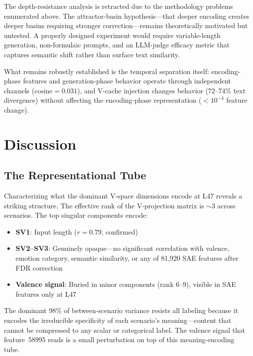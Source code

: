 \documentclass[11pt,a4paper]{article}
\begin{document}
The depth-resistance analysis is retracted due to the methodology problems
enumerated above. The attractor-basin hypothesis---that deeper encoding
creates deeper basins requiring stronger correction---remains theoretically
motivated but untested. A properly designed experiment would require
variable-length generation, non-formulaic prompts, and an LLM-judge
efficacy metric that captures semantic shift rather than surface text
similarity.

What remains robustly established is the temporal separation itself:
encoding-phase features and generation-phase behavior operate through
independent channels ($\text{cosine}{=}0.031$), and V-cache injection
changes behavior (72--74\% text divergence) without affecting the
encoding-phase representation ($< 10^{-4}$ feature change).

\section{Discussion}
\label{sec:discussion}

\subsection{The Representational Tube}

Characterizing what the dominant V-space dimensions encode at L47 reveals
a striking structure. The effective rank of the V-projection matrix is
$\sim$3 across scenarios. The top singular components encode:

\begin{itemize}[nosep]
  \item \textbf{SV1}: Input length ($r{=}0.79$, confirmed)
  \item \textbf{SV2--SV3}: Genuinely opaque---no significant correlation
    with valence, emotion category, semantic similarity, or any of 81,920
    SAE features after FDR correction
  \item \textbf{Valence signal}: Buried in minor components (rank 6--9),
    visible in SAE features only at L47
\end{itemize}

The dominant 98\% of between-scenario variance resists all labeling because
it encodes the irreducible specificity of each scenario's meaning---content
that cannot be compressed to any scalar or categorical label. The valence
signal that feature~58995 reads is a small perturbation on top of this
meaning-encoding tube.
\end{document}
